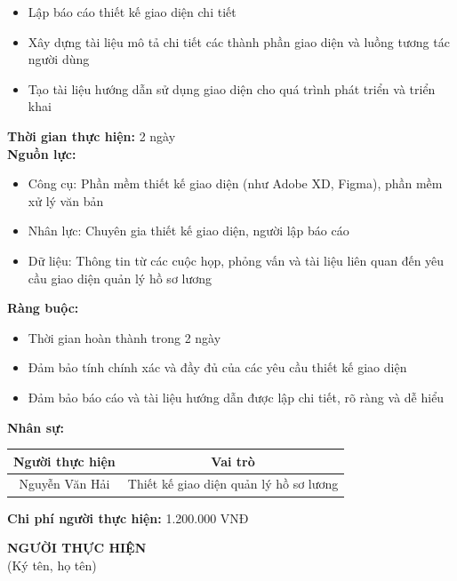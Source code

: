 {\begin{minipage}{\textwidth}
\begin{itemize}
        \item Lập báo cáo thiết kế giao diện chi tiết
        \item Xây dựng tài liệu mô tả chi tiết các thành phần giao diện và luồng tương tác người dùng
        \item Tạo tài liệu hướng dẫn sử dụng giao diện cho quá trình phát triển và triển khai
    \end{itemize}
    \vspace{0.5cm}
    \noindent \textbf{Thời gian thực hiện:} 2 ngày \\
    \noindent \textbf{Nguồn lực:}
    \begin{itemize}
        \item Công cụ: Phần mềm thiết kế giao diện (như Adobe XD, Figma), phần mềm xử lý văn bản
        \item Nhân lực: Chuyên gia thiết kế giao diện, người lập báo cáo
        \item Dữ liệu: Thông tin từ các cuộc họp, phỏng vấn và tài liệu liên quan đến yêu cầu giao diện quản lý hồ sơ lương
    \end{itemize}
    \vspace{0.5cm}
    \noindent \textbf{Ràng buộc:}
    \begin{itemize}
        \item Thời gian hoàn thành trong 2 ngày
        \item Đảm bảo tính chính xác và đầy đủ của các yêu cầu thiết kế giao diện
        \item Đảm bảo báo cáo và tài liệu hướng dẫn được lập chi tiết, rõ ràng và dễ hiểu
    \end{itemize}
    \vspace{0.5cm}
    \noindent \textbf{Nhân sự:}
    \begin{longtable}{|c|c|}
    \hline
    \textbf{Người thực hiện} & \textbf{Vai trò} \\
    \hline
    Nguyễn Văn Hải & Thiết kế giao diện quản lý hồ sơ lương \\
    \hline
    \end{longtable}
    \vspace{0.5cm}
    \noindent \textbf{Chi phí người thực hiện:} 1.200.000 VNĐ
    \vspace{1cm}
    \begin{flushleft}
        \hspace{8cm} \textbf{NGƯỜI THỰC HIỆN} \\
        \hspace{8.8cm} (Ký tên, họ tên) \\
        \vspace{1cm}
    \end{flushleft}
    \end{minipage}
}
% 
